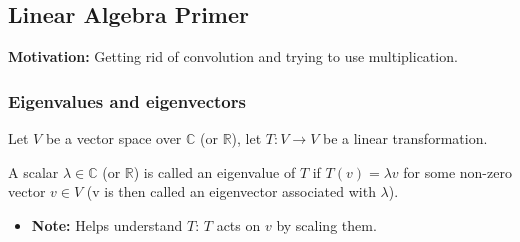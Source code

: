 \subsection{Linear Algebra Primer}
\textbf{Motivation:} Getting rid of convolution and trying to use multiplication. 

\subsubsection{Eigenvalues and eigenvectors}
\begin{definition}
    Let \( V \) be a vector space over \( \mathbb{C} \) (or \( \mathbb{R} \)), let \( T: V \rightarrow V \) be a linear transformation. 
    \vspace{1em}

    A scalar \( \lambda \in \mathbb{C} \) (or \( \mathbb{R} \)) is called an eigenvalue of \( T \) if \( T(v) = \lambda v \) for some non-zero vector \( v \in V \) (v is then called an eigenvector associated with \( \lambda \)).
    \begin{itemize}
        \item \textbf{Note:} Helps understand \( T \): \( T \) acts on \( v \) by scaling them.
    \end{itemize}
\end{definition}


